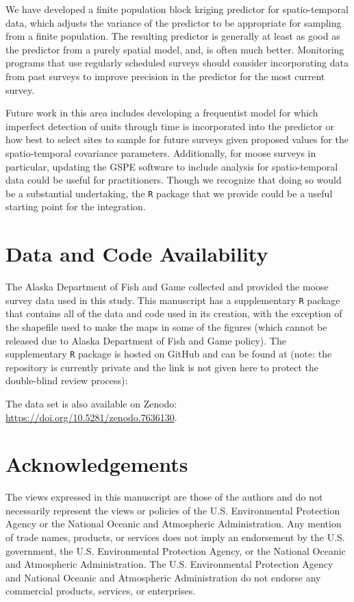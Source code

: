 \documentclass[smallextended]{svjour3}       %
\begin{document}
We have developed a finite population block kriging predictor for
spatio-temporal data, which adjusts the variance of the predictor to be
appropriate for sampling from a finite population. The resulting
predictor is generally at least as good as the predictor from a purely
spatial model, and, is often much better. Monitoring programs that use
regularly scheduled surveys should consider incorporating data from past
surveys to improve precision in the predictor for the most current
survey.

Future work in this area includes developing a frequentist model for
which imperfect detection of units through time is incorporated into the
predictor or how best to select sites to sample for future surveys given
proposed values for the spatio-temporal covariance parameters.
Additionally, for moose surveys in particular, updating the GSPE
software to include analysis for spatio-temporal data could be useful
for practitioners. Though we recognize that doing so would be a
substantial undertaking, the \texttt{R} package that we provide could be
a useful starting point for the integration.

\hypertarget{data-and-code-availability}{%
\section*{Data and Code Availability}\label{data-and-code-availability}}

The Alaska Department of Fish and Game collected and provided the moose
survey data used in this study. This manuscript has a supplementary
\texttt{R} package that contains all of the data and code used in its
creation, with the exception of the shapefile used to make the maps in
some of the figures (which cannot be released due to Alaska Department
of Fish and Game policy). The supplementary \texttt{R} package is hosted
on GitHub and can be found at (note: the repository is currently private
and the link is not given here to protect the double-blind review
process):

The data set is also available on Zenodo:
\url{https://doi.org/10.5281/zenodo.7636130}.

\hypertarget{acknowledgements}{%
\section{Acknowledgements}\label{acknowledgements}}

The views expressed in this manuscript are those of the authors and do
not necessarily represent the views or policies of the U.S.
Environmental Protection Agency or the National Oceanic and Atmospheric
Administration. Any mention of trade names, products, or services does
not imply an endorsement by the U.S. government, the U.S. Environmental
Protection Agency, or the National Oceanic and Atmospheric
Administration. The U.S. Environmental Protection Agency and National
Oceanic and Atmospheric Administration do not endorse any commercial
products, services, or enterprises.
\end{document}
